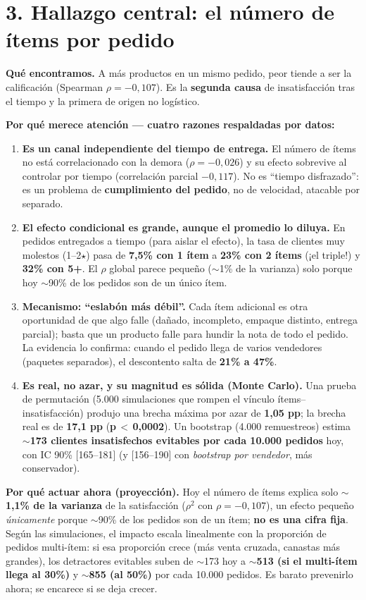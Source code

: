 \documentclass[10pt]{article}
\newcommand{\stars}{$\star$}
\newcommand{\kpi}[1]{\textbf{\textcolor{azlt}{#1}}}            %
\newcommand{\lead}[1]{\textcolor{az}{\sffamily\bfseries #1}}   %
\begin{document}
\section{3. Hallazgo central: el número de ítems por pedido}
\lead{Qué encontramos.} A más productos en un mismo pedido, peor tiende a ser la calificación (Spearman \kpi{$\rho=-0{,}107$}). Es la \textbf{segunda causa} de insatisfacción tras el tiempo y la primera de origen no logístico.

\lead{Por qué merece atención --- cuatro razones respaldadas por datos:}
\begin{enumerate}
\item \lead{Es un canal independiente del tiempo de entrega.} El número de ítems no está correlacionado con la demora ($\rho=-0{,}026$) y su efecto sobrevive al controlar por tiempo (correlación parcial $-0{,}117$). No es ``tiempo disfrazado'': es un problema de \textbf{cumplimiento del pedido}, no de velocidad, atacable por separado.
\item \lead{El efecto condicional es grande, aunque el promedio lo diluya.} En pedidos entregados a tiempo (para aislar el efecto), la tasa de clientes muy molestos (1--2\stars) pasa de \kpi{7,5\% con 1 ítem} a \kpi{23\% con 2 ítems} (¡el triple!) y \kpi{32\% con 5+}. El $\rho$ global parece pequeño ($\sim$1\% de la varianza) solo porque hoy $\sim$90\% de los pedidos son de un único ítem.
\item \lead{Mecanismo: ``eslabón más débil''.} Cada ítem adicional es otra oportunidad de que algo falle (dañado, incompleto, empaque distinto, entrega parcial); basta que un producto falle para hundir la nota de todo el pedido. La evidencia lo confirma: cuando el pedido llega de varios vendedores (paquetes separados), el descontento salta de \kpi{21\% a 47\%}.
\item \lead{Es real, no azar, y su magnitud es sólida (Monte Carlo).} Una prueba de permutación (5.000 simulaciones que rompen el vínculo ítems--insatisfacción) produjo una brecha máxima por azar de \textbf{1,05 pp}; la brecha real es de \kpi{17,1 pp} (\textbf{p\,$<$\,0,0002}). Un bootstrap (4.000 remuestreos) estima $\sim$\textbf{173 clientes insatisfechos evitables por cada 10.000 pedidos} hoy, con IC 90\% [165--181] (y [156--190] con \emph{bootstrap por vendedor}, más conservador).
\end{enumerate}

\lead{Por qué actuar ahora (proyección).} Hoy el número de ítems explica solo $\sim$\kpi{1,1\% de la varianza} de la satisfacción ($\rho^2$ con $\rho=-0{,}107$), un efecto pequeño \emph{únicamente} porque $\sim$90\% de los pedidos son de un ítem; \textbf{no es una cifra fija}. Según las simulaciones, el impacto escala linealmente con la proporción de pedidos multi-ítem: si esa proporción crece (más venta cruzada, canastas más grandes), los detractores evitables suben de $\sim$173 hoy a \kpi{$\sim$513 (si el multi-ítem llega al 30\%)} y \kpi{$\sim$855 (al 50\%)} por cada 10.000 pedidos. Es barato prevenirlo ahora; se encarece si se deja crecer.
\end{document}
